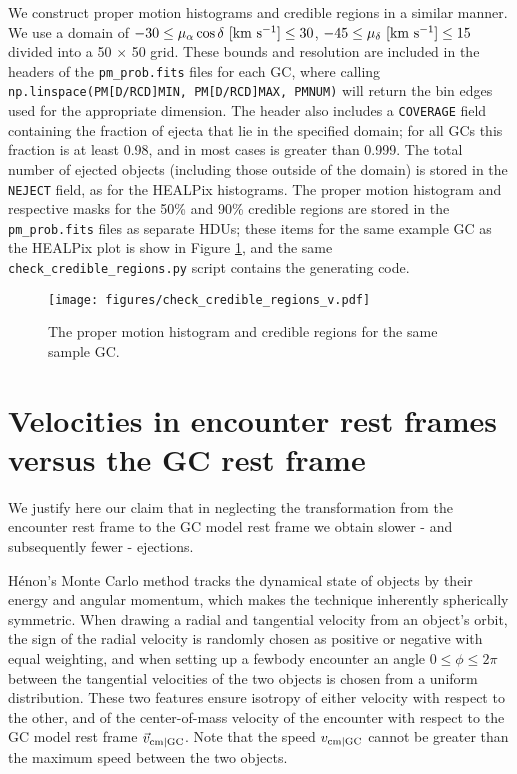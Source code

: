 \documentclass[twocolumn]{aastex631}
\begin{document}
We construct proper motion histograms and credible regions in a similar manner.
We use a domain of $-30 \le \mu_\alpha \cos \delta~{\rm [km~s^{-1}]} \le 30$, $-45 \le \mu_\delta~{\rm [km~s^{-1}]} \le 15$ divided into a 50 $\times$ 50 grid.
These bounds and resolution are included in the headers of the \texttt{pm\_prob.fits} files for each GC, where calling \texttt{np.linspace(PM[D/RCD]MIN, PM[D/RCD]MAX, PMNUM)} will return the bin edges used for the appropriate dimension.
The header also includes a \texttt{COVERAGE} field containing the fraction of ejecta that lie in the specified domain; for all GCs this fraction is at least 0.98, and in most cases is greater than 0.999.
The total number of ejected objects (including those outside of the domain) is stored in the \texttt{NEJECT} field, as for the HEALPix histograms.
The proper motion histogram and respective masks for the 50\% and 90\% credible regions are stored in the \texttt{pm\_prob.fits} files as separate HDUs; these items for the same example GC as the HEALPix plot is show in Figure \ref{fig:check_credible_regions_v}, and the same \texttt{check\_credible\_regions.py} script contains the generating code.

\begin{figure}
    \centering
    \texttt{[image: figures/check\_credible\_regions\_v.pdf]}
    \caption{
        The proper motion histogram and credible regions for the same sample GC.
    }
    \label{fig:check_credible_regions_v}
\end{figure}

\section{Velocities in encounter rest frames versus the GC rest frame} \label{app:restframe}

We justify here our claim that in neglecting the transformation from the encounter rest frame to the GC model rest frame we obtain slower - and subsequently fewer - ejections.

H\'enon's Monte Carlo method tracks the dynamical state of objects by their energy and angular momentum, which makes the technique inherently spherically symmetric.
When drawing a radial and tangential velocity from an object's orbit, the sign of the radial velocity is randomly chosen as positive or negative with equal weighting, and when setting up a fewbody encounter an angle $0 \le \phi \le 2\pi$ between the tangential velocities of the two objects is chosen from a uniform distribution.
These two features ensure isotropy of either velocity with respect to the other, and of the center-of-mass velocity of the encounter with respect to the GC model rest frame $\vec{v}_{\rm cm|GC}$.
Note that the speed $v_{\rm cm|GC}$ cannot be greater than the maximum speed between the two objects.
\end{document}
